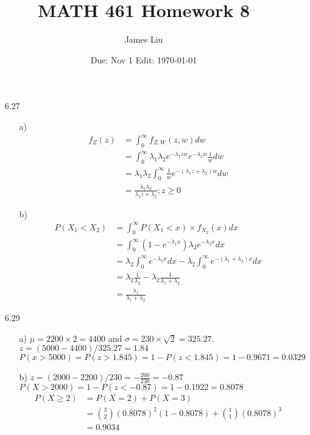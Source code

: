 \documentclass{article}
\date{Due: Nov 1 Edit: \today}
\title{MATH 461 Homework 8}
\author{James Liu}
\begin{document}
\maketitle
\begin{itemize}
    \item [6.27]
    \begin{itemize}
        \item [a)]    \begin{align*}
            f_Z(z)&=\int_{0}^{\infty} f_{Z,W}(z,w)dw\\
            &=\int_{0}^{\infty}\lambda_1\lambda_2e^{-\lambda_1zw}e^{-\lambda_2w}\frac{1}{w}dw\\
            &=\lambda_1\lambda_2\int_{0}^{\infty}\frac{1}{w}e^{-(\lambda_1z+\lambda_2)w}dw\\
            &=\frac{\lambda_1\lambda_2}{\lambda_1z+\lambda_2};z\geq0
        \end{align*}
        \item [b)]
        \begin{align*}
            P(X_1<X_2)&=\int_{0}^{\infty}P(X_1<x)\times f_{X_2}(x)dx\\
            &=\int_{0}^{\infty}(1-e^{-\lambda_1x})\lambda_2e^{-\lambda_2x}dx\\
            &=\lambda_2\int_{0}^{\infty}e^{-\lambda_2x}dx - \lambda_2\int_{0}^{\infty}e^{-(\lambda_1+\lambda_2)x}dx\\
            &=\lambda_2\frac{1}{\lambda_2}-\lambda_2\frac{1}{\lambda_1+\lambda_2}\\
            &=\frac{\lambda_1}{\lambda_1+\lambda_2}
        \end{align*}
    \end{itemize}
    \item [6.29]
    \begin{itemize}
        \item [a)] \(\mu = 2200\times 2 = 4400\) and \(\sigma = 230 \times \sqrt{2}=325.27\).\(z = (5000-4400)/325.27=1.84\)
        \(P(x>5000)=P(z>1.845)=1-P(z<1.845)=1-0.9671=0.0329\)
        \item [b)] \(z = (2000-2200)/230 = -\frac{200}{230} = -0.87\)
        \(P(X>2000)=1-P(z<-0.87)=1-0.1922=0.8078\)
        \begin{align*}
            P(X\geq 2)&=P(X=2)+P(X=3)\\
            &=\binom{3}{2}(0.8078)^2(1-0.8078)+\binom{1}{1}(0.8078)^3\\
            &=0.9034
        \end{align*}

\end{itemize}
\end{itemize}
\end{document}
